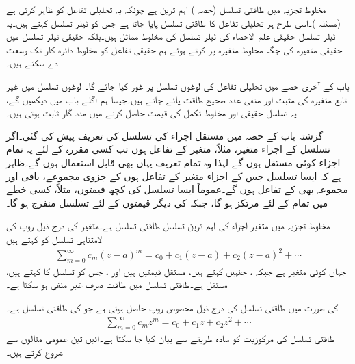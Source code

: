 مخلوط تجزیہ میں طاقتی تسلسل (حصہ )  اہم ترین ہے چونکہ یہ تحلیلی تفاعل کو ظاہر کرتی ہے (مسئلہ )۔اسی طرح ہر تحلیلی تفاعل کا طاقتی تسلسل پایا جاتا ہے جس کو ٹیلر تسلسل کہتے ہیں۔یہ  ٹیلر تسلسل حقیقی علم الاحصاء کی ٹیلر تسلسل کی مخلوط مماثل ہیں۔بلکہ حقیقی ٹیلر تسلسل میں حقیقی متغیرہ کی جگہ مخلوط متغیرہ پر کرتے ہوئے ہم حقیقی تفاعل کو مخلوط دائرہ کار تک وسعت دے سکتے ہیں۔

باب کے آخری حصے میں تحلیلی تفاعل کی لوغوں تسلسل پر غور کیا جائے گا۔ لوغوں تسلسل میں غیر تابع متغیرہ کی مثبت اور منفی عدد صحیح طاقت پائے جاتے ہیں۔جیسا ہم اگلے باب میں دیکھیں گے، یہ تسلسل حقیقی اور مخلوط تکمل کی قیمت حاصل کرنے میں مدد گار ثابت ہوتی ہیں۔

گزشتہ باب کے حصہ  میں مستقل اجزاء کی تسلسل کی تعریف پیش کی گئی۔اگر تسلسل کے اجزاء متغیر، مثلاً، متغیر  کے تفاعل  ہوں تب کسی مقررہ  کے لئے یہ تمام اجزاء کوئی مستقل ہوں گے لہٰذا وہ تمام تعریف یہاں بھی قابل استعمال ہوں گے۔ظاہر ہے کہ ایسا تسلسل جس کے اجزاء متغیر  کے تفاعل ہوں کے جزوی مجموعے، باقی اور مجموعہ بھی  کے تفاعل ہوں گے۔عموماً ایسا تسلسل  کی کچھ قیمتوں، مثلاً، کسی خطے میں تمام   کے لئے مرتکز ہو گا، جبکہ  کی دیگر قیمتوں کے لئے تسلسل منفرج ہو گا۔ 

مخلوط تجزیہ میں متغیر اجزاء کی اہم ترین تسلسل طاقتی تسلسل ہے۔متغیر   کی   درج ذیل روپ کی لامتناہی تسلسل کو کہتے ہیں
\begin{align}\label{مساوات_ٹیلر_طاقتی_تسلسل_الف}
\sum\limits_{m=0}^{\infty} c_m(z-a)^m=c_0+c_1(z-a)+c_2(z-a)^2+\cdots
\end{align}
 جہاں  کوئی متغیر ہے جبکہ ، جنہیں  کہتے ہیں، مستقل قیمتیں ہیں اور ، جس کو تسلسل کا  کہتے ہیں، مستقل ہے۔طاقتی تسلسل  میں طاقت  صرف غیر منفی ہو سکتا ہے۔

 کی صورت میں طاقتی تسلسل کی درج ذیل مخصوص روپ حاصل ہوتی ہے جو  کی طاقتی تسلسل ہے۔
\begin{align}\label{مساوات_ٹیلر_طاقتی_تسلسل_ب}
\sum\limits_{m=0}^{\infty} c_mz^m=c_0+c_1z+c_2z^2+\cdots
\end{align}
 طاقتی تسلسل کی مرکوزیت کو سادہ طریقے سے بیان کیا جا سکتا ہے۔آئیں تین عمومی مثالوں سے شروع کرتے ہیں۔

